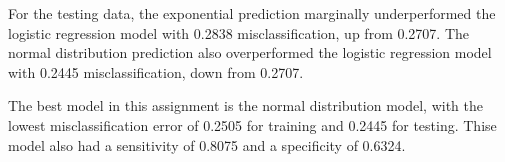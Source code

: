 \documentclass[a4paper]{article}
\begin{document}
For the testing data, the exponential prediction marginally underperformed the logistic regression model with 0.2838 misclassification, up from 0.2707. The normal distribution prediction also overperformed the logistic regression model with 0.2445 misclassification, down from 0.2707.


The best model in this assignment is the normal distribution model, with the lowest misclassification error of 0.2505 for training and 0.2445 for testing. Thise model also had a sensitivity of 0.8075 and a specificity of 0.6324.
\end{document}
